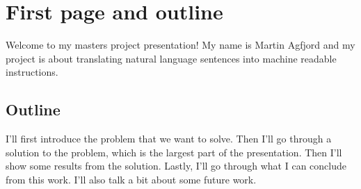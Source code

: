 \documentclass[
10pt, %
a4paper, %
oneside, %
headinclude,footinclude, %
BCOR5mm, %
]{scrartcl}
\title{\normalfont\spacedallcaps{Presentation content}} %
\author{\spacedlowsmallcaps{Martin Agfjord}} %
\date{} %
\begin{document}

\renewcommand{\sectionmark}[1]{\markright{\spacedlowsmallcaps{#1}}} %
\lehead{\mbox{\llap{\small\thepage\kern1em\color{halfgray} \vline}\color{halfgray}\hspace{0.5em}\rightmark\hfil}} %

\pagestyle{scrheadings} %


\maketitle %

\setcounter{tocdepth}{2} %

\tableofcontents %

\newpage %


\section{First page and outline}
Welcome to my masters project presentation! My name is Martin Agfjord and my project is about translating natural language sentences into machine readable instructions.
\subsection{Outline}
I'll first introduce the problem that we want to solve. Then I'll go through a solution to the problem, which is the largest part of the presentation. Then I'll show some results from the solution. Lastly, I'll go through what I can conclude from this work. I'll also talk a bit about some future work.
\end{document}
